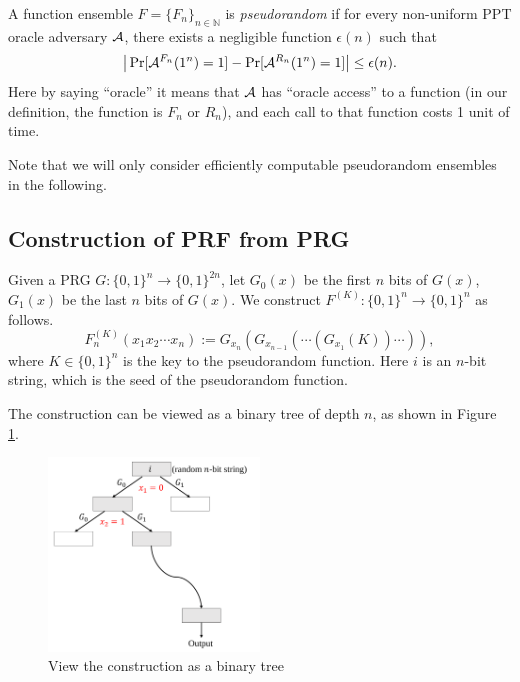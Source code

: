 \begin{definition}
A function ensemble $F = \{F_n\}_{n \in \mathbb{N}}$ is \emph{pseudorandom} if
for every non-uniform PPT oracle adversary $\mathcal{A}$, there exists a negligible function $\epsilon(n)$ such that
\[
\big| \Pr[\mathcal{A}^{F_n} (1^n) = 1] - \Pr[\mathcal{A}^{R_n} (1^n) = 1]  \big| \leq \epsilon(n).
\]
Here by saying ``oracle'' it means that $\mathcal{A}$ has ``oracle access'' to a function (in our definition, the function is $F_n$ or $R_n$), and each call to that function costs 1 unit of time.
\end{definition}

Note that we will only consider efficiently computable pseudorandom ensembles in the following.

\subsection{Construction of PRF from PRG}

\begin{construction}
Given a PRG $G: \{0, 1\}^n \rightarrow \{0, 1\}^{2n}$,
let $G_0(x)$ be the first $n$ bits of $G(x)$, $G_1(x)$ be the last $n$ bits of $G(x)$.
We construct $F^{(K)}: \{0, 1\}^n \rightarrow \{0, 1\}^n$ as follows.
\[
F^{(K)}_n(x_1 x_2 \cdots x_n) := G_{x_n}(G_{x_{n-1}} (\cdots(G_{x_1}(K)) \cdots  )),
\]
where $K \in \{0,1\}^n$ is the key to the pseudorandom function. Here $i$ is an $n$-bit string, which is the seed of the pseudorandom function.
\end{construction}
The construction can be viewed as a binary tree of depth $n$, as shown in Figure \ref{fig:binary-tree}.

\begin{figure}[h]
    \centering
    \includegraphics[width=0.5\textwidth]{Old Scribe Notes/binary-tree.pdf}
    \caption{View the construction as a binary tree}
    \label{fig:binary-tree}
\end{figure}

